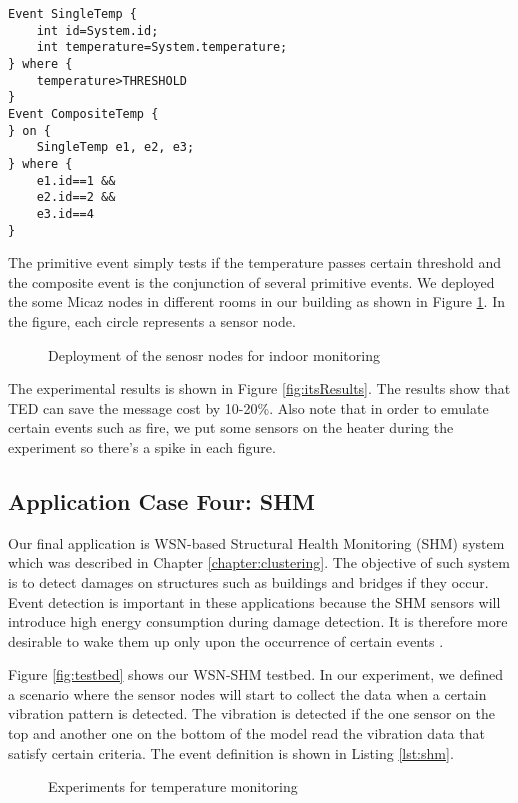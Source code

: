 \begin{lstlisting}[caption=Event definition for indoor monitoring, label=lst:indoorEvents]
Event SingleTemp {
	int id=System.id;
	int temperature=System.temperature;
} where {
	temperature>THRESHOLD
}
Event CompositeTemp {
} on {
	SingleTemp e1, e2, e3;
} where {
	e1.id==1 &&
	e2.id==2 &&
	e3.id==4
}
\end{lstlisting}

The primitive event simply tests if the temperature passes certain threshold and the composite event is the conjunction of several primitive events. We deployed the some Micaz nodes in different rooms in our building as shown in Figure \ref{fig:indoorDeployment}. In the figure, each circle represents a sensor node.

\begin{figure}
\centering
{}
\caption{Deployment of the senosr nodes for indoor monitoring}
\label{fig:indoorDeployment}
\end{figure}

The experimental results is shown in Figure \ref{fig:itsResults}. The results show that TED can save the message cost by 10-20\%. Also note that in order to emulate certain events such as fire, we put some sensors on the heater during the experiment so there's a spike in each figure.

\subsection{Application Case Four: SHM}
Our final application is WSN-based Structural Health Monitoring (SHM) system which was described in Chapter \ref{chapter:clustering}. The objective of such system is to detect damages on structures such as buildings and bridges if they occur. Event detection is important in these applications because the SHM sensors will introduce high energy consumption during damage detection. It is therefore more desirable to wake them up only upon the occurrence of certain events \cite{jangshm}.

Figure \ref{fig:testbed} shows our WSN-SHM testbed. In our experiment, we defined a scenario where the sensor nodes will start to collect the data when a certain vibration pattern is detected. The vibration is detected if the one sensor on the top and another one on the bottom of the model read the vibration data that satisfy certain criteria. The event definition is shown in Listing \ref{lst:shm}.

\begin{figure}
\centering
{}
\caption{Experiments for temperature monitoring}
\label{fig:indoorResult}
\end{figure}

